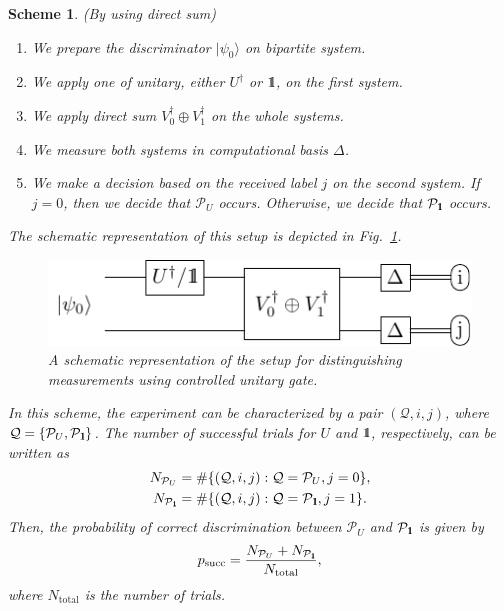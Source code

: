 \documentclass[preprint,12pt, a4paper]{elsarticle}
\newcommand{\ket}[1]{\ensuremath{|#1\rangle}}
\newcommand{\bra}[1]{\ensuremath{\langle#1|}}
\newcommand{\ketbra}[2]{\ensuremath{\ket{#1}\bra{#2}}}
\newcommand{\proj}[1]{\ensuremath{\ketbra{#1}{#1}}}
\newcommand{\1}{{\rm 1\hspace{-0.9mm}l}}
\newcommand{\Id}{{\rm 1\hspace{-0.9mm}l}}
\newcommand{\PP}{\mathcal{P}}
\newtheorem{scheme}{Scheme}
\begin{document}
\begin{scheme}(By using direct sum)



\begin{enumerate}
\item We prepare the discriminator $\ket{\psi_{0}}$ on bipartite
system.
\item We apply one of unitary,   either $U^\dagger$ or
$\Id$, on the first system.
\item We apply direct sum $V_0^\dagger \oplus V_1^\dagger$ on the whole systems.
\item We measure both systems in computational basis $\Delta$.
\item We make a decision based on the received label $j$ on the second system. If $j=0$, then we
decide that $\PP_U$ occurs. Otherwise, we decide that $\PP_{\Id}$ occurs.
\end{enumerate}

The schematic representation of this setup is depicted in
Fig.~\ref{fig:controlled}.
\begin{figure}[h!]
	\centering
	\includegraphics[scale=1.5]{pics/controlled_unitary}

	\caption{ A schematic representation of the setup for distinguishing
		measurements using controlled unitary gate.
	}\label{fig:controlled}
\end{figure}

In this scheme, the experiment can be characterized by a pair $(\mathcal{Q}, i,j)$, where $\mathcal{Q} = \{ \PP_{U}, \PP_{\Id} \}$. The number of successful trials for $U$ and $\Id$, respectively, can be written  as
\begin{eqnarray}
N_{\PP_U} &= \#\{(\mathcal{Q},  i, j): \mathcal{Q} = \PP_U, j = 0\}, \\
N_{\PP_\Id} &= \#\{(\mathcal{Q},  i, j): \mathcal{Q} = \PP_\Id, j = 1\}.
\end{eqnarray}
Then, the probability of correct discrimination between $\PP_{U} $ and $\PP_\Id$ is given by
\begin{equation}
p_{\text{succ}} = \frac{N_{\PP_{U}} + N_{\PP_{\Id}}}{N_{\text{total}}},
\end{equation}
where $N_{\text{total}}$ is the number of trials.
\end{scheme}
\end{document}
